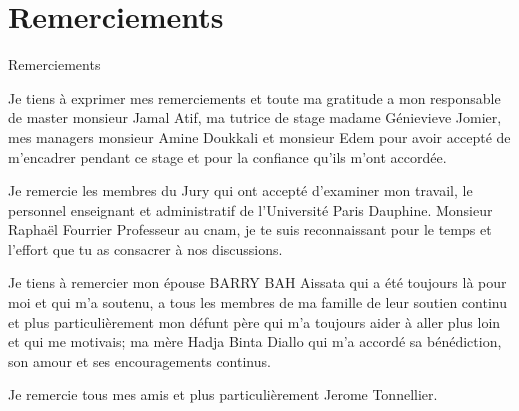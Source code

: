 \section*{Remerciements}


Remerciements

Je tiens à exprimer mes remerciements et toute ma gratitude a mon responsable de master monsieur Jamal Atif, ma tutrice de stage madame Génievieve Jomier, mes managers monsieur Amine Doukkali et monsieur Edem pour avoir accepté de m'encadrer pendant ce stage et pour la confiance qu'ils m'ont accordée.

Je remercie les membres du Jury qui ont accepté d'examiner mon travail, le personnel enseignant et administratif de l'Université Paris Dauphine. Monsieur Raphaël Fourrier Professeur au cnam, je te suis reconnaissant pour le temps et l'effort que tu as consacrer à nos discussions.


Je tiens à remercier mon épouse BARRY BAH Aissata qui a été toujours là pour moi et qui m'a soutenu, a tous les membres de ma famille de leur soutien continu et plus particulièrement mon défunt père qui m'a toujours aider à aller plus loin et qui me motivais; ma mère Hadja Binta Diallo qui m'a accordé sa bénédiction, son amour et ses encouragements continus.

Je remercie tous mes amis et plus particulièrement Jerome Tonnellier.








